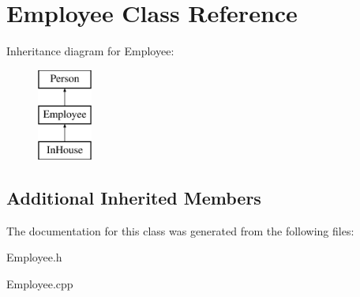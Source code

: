 \hypertarget{class_employee}{}\section{Employee Class Reference}
\label{class_employee}
Inheritance diagram for Employee\+:\begin{figure}[H]
\begin{center}
\leavevmode
\includegraphics[height=3.000000cm]{class_employee}
\end{center}
\end{figure}
\subsection*{Additional Inherited Members}


The documentation for this class was generated from the following files\+:\begin{DoxyCompactItemize}
\item 
Employee.\+h\item 
Employee.\+cpp\end{DoxyCompactItemize}
